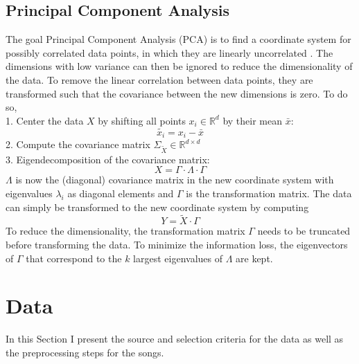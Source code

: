 \documentclass[conference]{IEEEtran}
\begin{document}
\subsection{Principal Component Analysis}
The goal Principal Component Analysis (PCA) is to find a coordinate system for possibly correlated data points, in which they are linearly uncorrelated \cite{pca_leskovec, pca_jolliffe}. The dimensions with low variance can then be ignored to reduce the dimensionality of the data. To remove the linear correlation between data points, they are transformed such that the covariance between the new dimensions is zero. To do so,\\
1. Center the data $X$ by shifting all points $x_i \in \mathbb{R}^d$ by their mean $\bar{x}$: $${\widetilde{x_i} = x_i - \bar{x}}$$
2. Compute the covariance matrix $\Sigma_{\widetilde{X}} \in \mathbb{R}^{d{\times}d}$\\
3. Eigendecomposition of the covariance matrix: $$X = \Gamma \cdot \Lambda \cdot \Gamma$$
$\Lambda$ is now the (diagonal) covariance matrix in the new coordinate system with eigenvalues $\lambda_i$ as diagonal elements and $\Gamma$ is the transformation matrix. The data can simply be transformed to the new coordinate system by computing $${Y = \widetilde{X} \cdot \Gamma}$$
To reduce the dimensionality, the transformation matrix $\Gamma$ needs to be truncated before transforming the data. To minimize the information loss, the eigenvectors of $\Gamma$ that correspond to the $k$ largest eigenvalues of $\Lambda$ are kept.

\section{Data}
In this Section I present the source and selection criteria for the data as well as the preprocessing steps for the songs.
\end{document}
